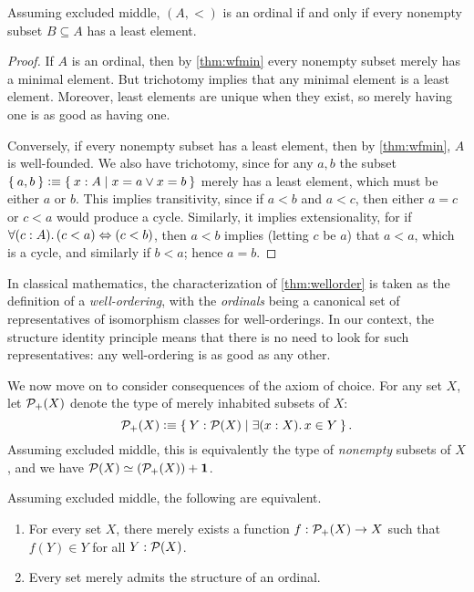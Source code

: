 \begin{thm}\label{thm:wellorder}
  Assuming excluded middle, $(A,<)$ is an ordinal if and only if every nonempty subset $B\subseteq A$ has a least element.
\end{thm}
\begin{proof}
  If $A$ is an ordinal, then by \autoref{thm:wfmin} every nonempty subset merely has a minimal element.
  But trichotomy implies that any minimal element is a least element.
  Moreover, least elements are unique when they exist, so merely having one is as good as having one.

  Conversely, if every nonempty subset has a least element, then by \autoref{thm:wfmin}, $A$ is well-founded.
  We also have trichotomy, since for any $a,b$ the subset
  $ \Set{a,b} \vcentcolon\equiv \Set{x:A | x=a \lor x=b} $
  merely has a least element, which must be either $a$ or $b$.
  This implies transitivity, since if $a<b$ and $a<c$, then either $a=c$ or $c<a$ would produce a cycle.
  Similarly, it implies extensionality, for if $\fall{c:A}(c<a)\Leftrightarrow (c<b)$, then $a<b$ implies (letting $c$ be $a$) that $a<a$, which is a cycle, and similarly if $b<a$; hence $a=b$.
\end{proof}

In classical mathematics, the characterization of \autoref{thm:wellorder} is taken as the definition of a \emph{well-ordering}, with the \emph{ordinals} being a canonical set of representatives of isomorphism classes for well-orderings.
In our context, the structure identity principle means that there is no need to look for such representatives: any well-ordering is as good as any other.

We now move on to consider consequences of the axiom of choice.
For any set $X$, let $\mathcal{P}_+(X)$ denote the type of merely inhabited subsets of $X$:
\[ \powerp X \defeq \setof{ Y : \power X | \exis{x:X} x\in Y}. \]
Assuming excluded middle, this is equivalently the type of \emph{nonempty} subsets of $X$, and we have $\mathcal{P}(X) \simeq (\mathcal{P}_+(X)) + \mathbf{1}$.

\begin{thm}\label{thm:wop}
  Assuming excluded middle, the following are equivalent.
  \begin{enumerate}
  \item For every set $X$, there merely exists a function
    $ f: \mathcal{P}_+(X) \to X $
    such that $f(Y)\in Y$ for all $Y:\mathcal{P}(X)$.\label{item:wop1}
  \item Every set merely admits the structure of an ordinal.\label{item:wop2}
  \end{enumerate}
\end{thm}

